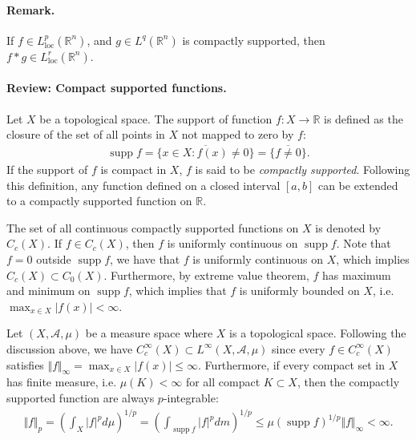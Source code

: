 \documentclass{article}
\numberwithin{equation}{section}
\newcommand{\bbR}{\mathbb{R}}
\newcommand{\loc}{\mathrm{loc}}
\DeclareMathOperator{\supp}{supp}
\theoremstyle{plain}
\theoremstyle{definition}
\begin{document}
\paragraph{Remark.} If $f\in L^p_\loc(\bbR^n)$, and $g\in L^q(\bbR^n)$ is compactly supported, then $f*g\in L^r_\loc(\bbR^n)$.
\paragraph{Review: Compact supported functions.} Let $X$ be a topological space. The support of function $f:X\to\mathbb{R}$ is defined as the closure of the set of all points in $X$ not mapped to zero by $f$:
\begin{align*}
	\supp f = \overline{\{x\in X: f(x)\neq 0\}} = \overline{\{f\neq 0\}}.
\end{align*}
If the support of $f$ is compact in $X$, $f$ is said to be \textit{compactly supported}. Following this definition, any function defined on a closed interval $[a,b]$ can be extended to a compactly supported function on $\mathbb{R}$.

The set of all continuous compactly supported functions on $X$ is denoted by $C_c(X)$. If $f\in C_c(X)$, then $f$ is uniformly continuous on $\supp f$. Note that $f=0$ outside $\supp f$, we have that $f$ is uniformly continuous on $X$, which implies $C_c(X)\subset C_0(X)$. Furthermore, by extreme value theorem, $f$ has maximum and minimum on $\supp f$, which implies that $f$ is uniformly bounded on $X$, i.e. $\max_{x\in X}\vert f(x)\vert < \infty$.

Let $(X,\mathscr{A},\mu)$ be a measure space where $X$ is a topological space. Following the discussion above, we have $C_c^\infty(X)\subset L^\infty(X,\mathscr{A},\mu)$ since every $f\in C_c^\infty(X)$ satisfies $\Vert f\Vert_\infty =\max_{x\in X}\vert f(x)\vert \leq \infty$. Furthermore, if every compact set in $X$ has finite measure, i.e. $\mu(K)<\infty$ for all compact $K\subset X$, then the compactly supported function are always $p$-integrable:
\begin{align*}
	\Vert f\Vert_p = \left(\int_X\vert f\vert^p d\mu\right)^{1/p} = \left(\int_{\supp f} \vert f\vert^p dm\right)^{1/p} \leq \mu(\supp f)^{1/p}\Vert f\Vert_\infty <\infty.
\end{align*}
\end{document}
